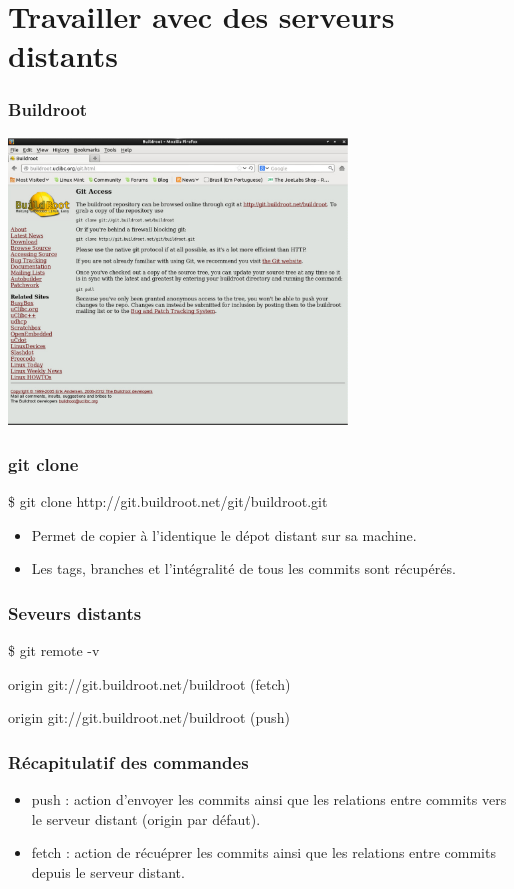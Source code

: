 \documentclass{beamer}
\begin{document}

\section{Travailler avec des serveurs distants}
\begin{frame}
  \frametitle{Buildroot}
  \includegraphics[width=9cm]{imgs/buildroot.eps}
\end{frame}


\begin{frame}
  \frametitle{git clone}
  \begin{semiverbatim}
    \$ git clone http://git.buildroot.net/git/buildroot.git
  \end{semiverbatim}
  \begin{itemize}
    \item Permet de copier à l'identique le dépot distant sur sa machine.
    \item Les tags, branches et l'intégralité de tous les commits sont récupérés.
  \end{itemize}
\end {frame}

\begin{frame}
  \frametitle{Seveurs distants}
  \begin{semiverbatim}
    \$ git remote -v

    origin git://git.buildroot.net/buildroot (fetch)

    origin git://git.buildroot.net/buildroot (push)
  \end{semiverbatim}
\end{frame}

\begin{frame}
  \frametitle{Récapitulatif des commandes}
  \begin{itemize}
  \item push : action d'envoyer les commits ainsi que les relations entre commits vers le serveur distant (origin par défaut).
  \item fetch : action de récuéprer les commits ainsi que les relations entre commits depuis le serveur distant.
  \end{itemize}
\end{frame}
\end{document}
